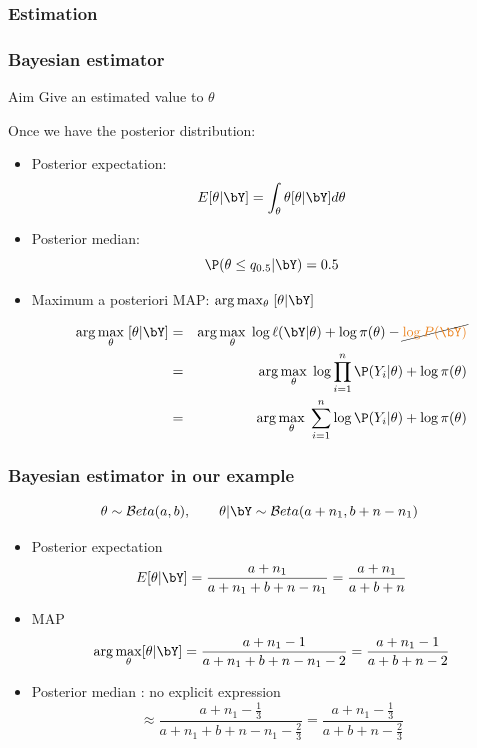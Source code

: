 \subsubsection{Estimation}
 \begin{frame}\frametitle{Bayesian estimator}
 \begin{block}{Aim}
 Give an estimated value to $\theta$
 \end{block}
 
 Once we have the posterior distribution: 
 \begin{itemize}
 \item \vert Posterior expectation: \noir  $$E[\theta | \bY] = \int_{\theta} \theta [\theta | \bY]d\theta$$
 \item \vert Posterior median: \noir $$\P(\theta \leq q_{0.5} | \bY) = 0.5$$  
  \item \vert Maximum a posteriori MAP: 
    \noir $\arg\max_\theta \;  [\theta | \bY]$ 
  
 {\scriptsize  \begin{eqnarray*}
  \arg\max_\theta \;  [\theta | \bY] &=& \arg\max_{\theta} \; \log \ell(\bY | \theta)  + \log \pi(\theta) - \cancel{\vert \log P(\bY)}\\
  &=& \arg\max_{\theta} \; \log \prod_{i=1}^n \P(Y_i | \theta)   + \log \pi(\theta)  \\
  &=& \arg\max_{\theta} \; \sum_{i=1}^n \log \P(Y_i | \theta)   + \log \pi(\theta)  
      \end{eqnarray*}}
 
  \end{itemize}
 
  \end{frame}

  \begin{frame}\frametitle{Bayesian estimator in our example}
$$\theta \sim \mathcal{B}eta(a,b), \quad \quad \theta | \bY \sim \mathcal{B}eta(a + n_1, b+n-n_1)$$ 

  \begin{itemize}
 
\item\vert  Posterior expectation  \noir
$$ E[ \theta  | \bY] = \frac{a + n_1}{a + n_1+ b+n-n_1} = \frac{a + n_1}{a+b+n}$$
\item \vert MAP \noir
 $$\arg\max_\theta [\theta | \bY] =  \frac{a + n_1 - 1}{a + n_1+ b+n-n_1-2} = \frac{a + n_1-1}{a+b+n-2}$$
 \item \vert Posterior median \noir : no explicit expression 
 $$\approx \frac{a + n_1 - \frac{1}{3}}{a + n_1 +  b+n-n_1 - \frac{2}{3}} =  \frac{a + n_1 - \frac{1}{3}}{a +   b+n - \frac{2}{3}}$$
\end{itemize}
 
  \end{frame}
      
